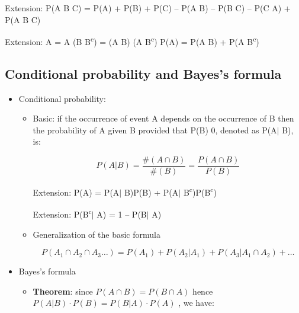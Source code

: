 \documentclass[12pt]{report}
\renewcommand{\_}{\kern-1.5pt\textunderscore\kern-1.5pt}
\begin{document}
\begin{itemize}
\begin{itemize}
Extension: P(A B  C) = P(A) + P(B) + P(C) – P(A  B) – P(B  C) – P(C  A) + P(A  B  C)\par

Extension: A = A  (B  B\textsuperscript{c}) = (A  B)  (A  B\textsuperscript{c})  P(A) = P(A  B) + P(A  B\textsuperscript{c})\par


\end{itemize}
\end{itemize}\subsection*{Conditional probability and Bayes’s formula}
\begin{itemize}
	\item Conditional probability: \par

\begin{itemize}
	\item Basic: if the occurrence of event A depends on the occurrence of B then the probability of A given B provided that P(B)  0, denoted as P(A$ \vert $ B), is:\par

 \[ P \left( A \vert B \right) =\frac{\# \left( A \cap B \right) }{\# \left( B \right) }=\frac{P \left( A \cap B \right) }{P \left( B \right) } \] \par

\tab Extension: P(A) = P(A$ \vert $ B)P(B) + P(A$ \vert $ B\textsuperscript{c})P(B\textsuperscript{c})\par

\tab Extension: P(B\textsuperscript{c}$ \vert $ A) = 1 – P(B$ \vert $ A)\par

	\item Generalization of the basic formula\par

 \[ P \left( A_{1} \cap A_{2} \cap A_{3} \ldots  \right) =P \left( A_{1} \right) +P \left( A_{2} \vert A_{1} \right) +P \left( A_{3} \vert A_{1} \cap A_{2} \right) + \ldots  \] \par


\end{itemize}
	\item Bayes’s formula\par

\begin{itemize}
	\item \textbf{Theorem}: since  \( P \left( A \cap B \right) =P \left( B \cap A \right)  \)  hence  \( P \left( A \vert B \right)  \cdot P \left( B \right) =P \left( B \vert A \right)  \cdot P \left( A \right)  \) , we have:\par


\end{itemize}
\end{itemize}
\end{document}
